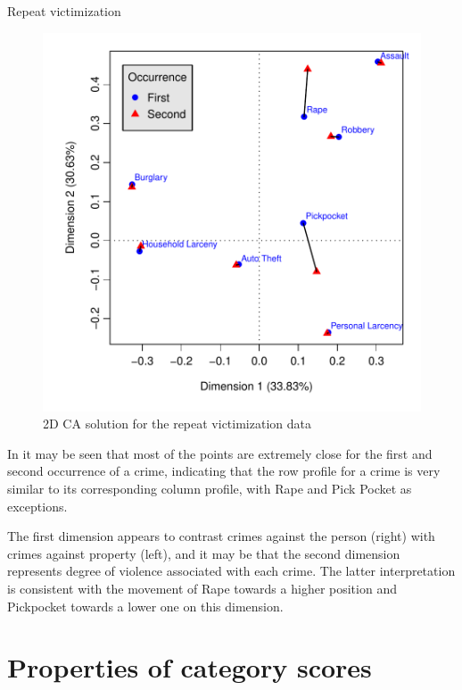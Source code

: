 \documentclass[11pt]{book}\usepackage[]{graphicx}\usepackage[]{color}
\newenvironment{knitrout}{}{} %
\renewenvironment{knitrout}{\small\renewcommand{\baselinestretch}{.85}}{} %
\begin{document}
\begin{Example}[victims2]{Repeat victimization}
\begin{knitrout}
\begin{figure}[!htb]
\centerline{\includegraphics{ch06/fig/ca-victims-plot} }

\caption[2D CA solution for the repeat victimization data]{2D CA solution for the repeat victimization data\label{fig:ca-victims-plot}}
\end{figure}


\end{knitrout}


In  it may be seen that most of the points are
extremely close for the first and second occurrence of a crime,  indicating
that the row profile for a crime is very similar to its corresponding column
profile, with Rape and Pick Pocket as exceptions.

The first dimension appears to contrast crimes against the person (right) with
crimes against property (left), and it may be that the second dimension
represents degree of violence associated with each crime.
The latter interpretation is consistent with the movement of Rape towards
a higher position and Pickpocket towards a lower one on this dimension.


\end{Example}


\section{Properties of category scores}\label{sec:ca-scores}
\end{document}
